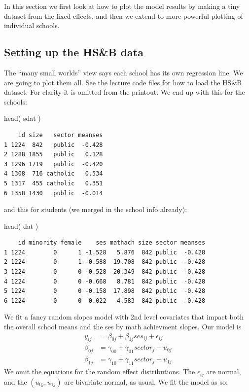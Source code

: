 \documentclass[
  letterpaper,
  DIV=11,
  numbers=noendperiod]{scrreprt}
\newenvironment{Shaded}{\begin{snugshade}}{\end{snugshade}}
\newcommand{\FunctionTok}[1]{\textcolor[rgb]{0.02,0.16,0.49}{#1}}
\newcommand{\NormalTok}[1]{\textcolor[rgb]{0.00,0.44,0.13}{#1}}
\begin{document}
In this section we first look at how to plot the model results by making
a tiny dataset from the fixed effects, and then we extend to more
powerful plotting of individual schools.

\hypertarget{setting-up-the-hsb-data}{%
\subsection{Setting up the HS\&B data}\label{setting-up-the-hsb-data}}

The ``many small worlds'' view says each school has its own regression
line. We are going to plot them all. See the lecture code files for how
to load the HS\&B dataset. For clarity it is omitted from the printout.
We end up with this for the schools:

\begin{Shaded}
\begin{Highlighting}[]
\FunctionTok{head}\NormalTok{( sdat )}
\end{Highlighting}
\end{Shaded}

\begin{verbatim}
    id size   sector meanses
1 1224  842   public  -0.428
2 1288 1855   public   0.128
3 1296 1719   public  -0.420
4 1308  716 catholic   0.534
5 1317  455 catholic   0.351
6 1358 1430   public  -0.014
\end{verbatim}

and this for students (we merged in the school info already):

\begin{Shaded}
\begin{Highlighting}[]
\FunctionTok{head}\NormalTok{( dat )}
\end{Highlighting}
\end{Shaded}

\begin{verbatim}
    id minority female    ses mathach size sector meanses
1 1224        0      1 -1.528   5.876  842 public  -0.428
2 1224        0      1 -0.588  19.708  842 public  -0.428
3 1224        0      0 -0.528  20.349  842 public  -0.428
4 1224        0      0 -0.668   8.781  842 public  -0.428
5 1224        0      0 -0.158  17.898  842 public  -0.428
6 1224        0      0  0.022   4.583  842 public  -0.428
\end{verbatim}

We fit a fancy random slopes model with 2nd level covariates that impact
both the overall school means and the ses by math achievment slopes. Our
model is \[
\begin{aligned}
y_{ij} &= \beta_{0j} + \beta_{1j} ses_{ij} +  \epsilon_{ij} \\
\beta_{0j} &= \gamma_{00} + \gamma_{01} sector_j + u_{0j} \\
\beta_{1j} &= \gamma_{10} + \gamma_{11} sector_j + u_{1j} 
\end{aligned}
\] We omit the equations for the random effect distributions. The
\(\epsilon_{ij}\) are normal, and the \((u_{0j},u_{1j})\) are bivariate
normal, as usual. We fit the model as so:
\end{document}
